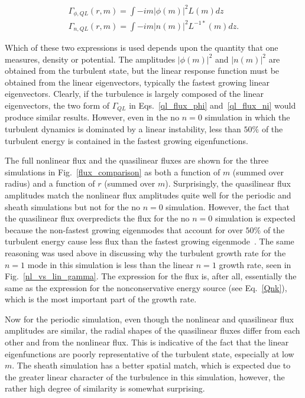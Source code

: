 \documentclass[showpacs,preprintnumbers,amsmath,amssymb,superscriptaddress,aip]{revtex4-1}
\def\beqar{\begin{eqnarray}}
\def\eeqar{\end{eqnarray}}
\begin{document}
\beqar
\label{ql_flux_phi}
\Gamma_{\phi,QL}(r,m) = \int - i m |\phi(m)|^2 L(m) dz \\
\label{ql_flux_ni}
\Gamma_{n,QL}(r,m) = \int - i m |n(m)|^2 L^{-1 *}(m) dz.
\eeqar

Which of these two expressions is used depends upon the quantity that one measures, density or potential.
The amplitudes $|\phi(m)|^2$ and $|n(m)|^2$ are obtained from the turbulent state, but the linear response function must be obtained from the linear eigenvectors, typically the fastest growing
linear eigenvectors. Clearly, if the turbulence is largely composed of the linear eigenvectors, the two form of $\Gamma_{QL}$ in Eqs.~\ref{ql_flux_phi} and~\ref{ql_flux_ni} would produce similar
results. However, even in the no $n=0$ simulation in which the turbulent dynamics is dominated by a linear instability, 
less than $50\%$ of the turbulent energy is contained in the fastest growing eigenfunctions.

The full nonlinear flux and the quasilinear fluxes are shown for the three simulations in Fig.~\ref{flux_comparison} as both a function of $m$ (summed over radius) and a function of $r$
(summed over $m$). Surprisingly, the quasilinear flux amplitudes match the nonlinear flux
amplitudes quite well for the periodic and sheath simulations but not for the no $n=0$ simulation. However, the fact that the quasilinear flux overpredicts the flux for the no $n=0$ simulation is
expected because the non-fastest growing eigenmodes that account for over $50\%$ of the turbulent energy cause less flux than the fastest growing eigenmode~\cite{terry2006a}. The same reasoning
was used above in discussing why the turbulent growth rate for the $n=1$ mode in this simulation is less than the linear $n=1$ growth rate, seen in Fig.~\ref{nl_vs_lin_gamma}. The expression
for the flux is, after all, essentially the same as the expression for the nonconservative energy source (see Eq.~\ref{Qnk}), which is the most important part of the growth rate.

Now for the periodic simulation, even though the nonlinear and quasilinear flux amplitudes are similar, the radial shapes of the quasilinear fluxes differ from each other and from
the nonlinear flux. This is indicative of the fact that the linear eigenfunctions are poorly representative of the turbulent state, especially at low $m$.
The sheath simulation has a better spatial match, which is expected due to the greater linear character of the turbulence in this simulation, however, the rather high degree of similarity
is somewhat surprising.
\end{document}

